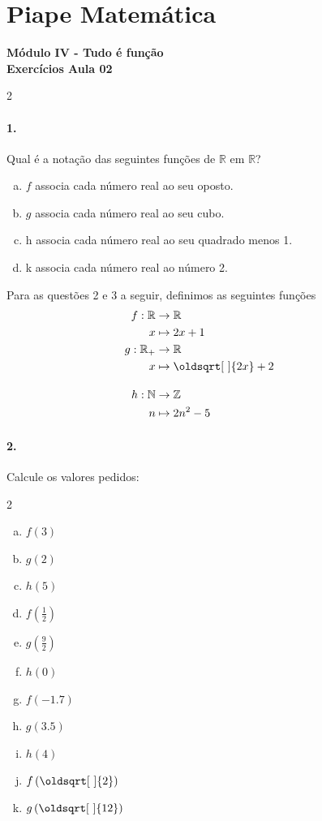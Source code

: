 \documentclass[a4paper,12pt]{article}
\renewcommand*{\sqrt}[2][\ ]{\oldsqrt[#1]{#2}}
\begin{document}
 
  
\section*{Piape Matemática} 
\textbf{Módulo IV - Tudo é função}\\
\textbf{Exercícios Aula 02}         
\begin{multicols}{2}
\paragraph*{1.}  
Qual é a notação das seguintes funções de $\mathbb{R}$ em $\mathbb{R}$?
\begin{enumerate}[a)] 
    \item $f$ associa cada número real ao seu oposto.
    \item $g$ associa cada número real ao seu cubo.
    \item h associa cada número real ao seu quadrado menos 1.
    \item k associa cada número real ao número 2.
\end{enumerate}

Para as questões 2 e 3 a seguir, definimos as seguintes funções
$$
\begin{aligned} 
f:\mathbb{R} &\to \mathbb{R} \\
x &\mapsto 2x + 1 \\
g:\mathbb{R}_{+} & \to \mathbb{R} \\
 x&\mapsto \sqrt{2x} + 2\\[1em]
h: \mathbb{N} &\to \mathbb{Z} &   &  \\
n &\mapsto 2n^2 - 5 &   &  \\
\end{aligned}
$$
\paragraph*{2.} Calcule os valores pedidos:
\begin{multicols*}{2}
    \begin{enumerate}[a)]
        \item $f(3)$ %
        \item $g(2)$ %
        \item $h(5)$ %
        \item $f\left(\frac{1}{2}\right)$ %
        \item $g\left(\frac{9}{2}\right)$ %
        \item $h(0)$ %
        \item $f(-1.7)$ %
        \item $g(3.5)$ %
        \item $h(4)$ %
        \item $f\left(\sqrt{2}\right)$ %
        \item $g\left(\sqrt{12}\right)$ %
    \end{enumerate}
    

\end{multicols*}
\end{multicols}
\end{document}
